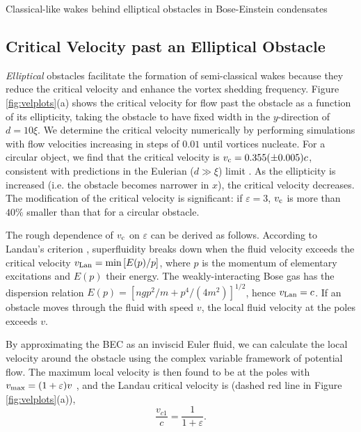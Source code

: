 \begin{chapter}{\label{cha:wake}Classical-like wakes behind elliptical obstacles in Bose-Einstein condensates}
\subsection{Critical Velocity past an Elliptical Obstacle}
\label{sec:crit_vel}
{\em Elliptical} obstacles facilitate the formation of semi-classical wakes because they reduce the critical velocity and enhance the vortex shedding frequency.  Figure \ref{fig:velplots}(a) shows the critical velocity for flow past the obstacle as a function of its ellipticity, taking the obstacle to have fixed width in the $y$-direction of $d=10\xi$.  We determine the critical velocity numerically by performing simulations with flow velocities increasing in steps of $0.01$ until vortices nucleate.  
For a circular object, we find that the critical velocity is $v_{\rm c}=0.355 (\pm 0.005)c$, consistent with predictions in the Eulerian ($d \gg \xi$) limit \cite{berloff2000,rica2001,pham2004}.  As the ellipticity is increased (i.e. the obstacle becomes narrower in $x$), the critical velocity decreases.  The modification of the critical velocity is significant: if $\varepsilon=3$, $v_{\rm c}$ is more than $40\%$ smaller than that for a circular obstacle. 

The rough dependence of $v_{\rm c}$ on $\varepsilon$ can be derived as follows.   According to Landau's criterion \cite{NozieresPines},  superfluidity breaks down when the fluid velocity exceeds the critical velocity $v_{\rm Lan}=\min \left[E(p)/p\right]$, where $p$ is the momentum of elementary excitations and $E(p)$ their energy.   The weakly-interacting Bose gas has the dispersion relation $E(p)=[ngp^2/m + p^4/(4m^2)]^{1/2}$, hence $v_{\rm Lan}=c$.  If an obstacle moves through the fluid with speed $v$, the local fluid velocity at the poles exceeds $v$.

By approximating the BEC as an inviscid Euler fluid, we can calculate the local velocity around the obstacle using the complex variable framework of potential flow. The maximum local velocity is then found to be at the poles with $v_{\rm max}=(1+\varepsilon)v$ \cite{Schlichting42}, and the Landau critical velocity is (dashed red line in Figure \ref{fig:velplots}(a)),
\begin{equation}
\frac{v_{c1}}{c} = \frac{1}{1+\varepsilon}.
\label{eq:crit1}
\end{equation}


\end{chapter}
